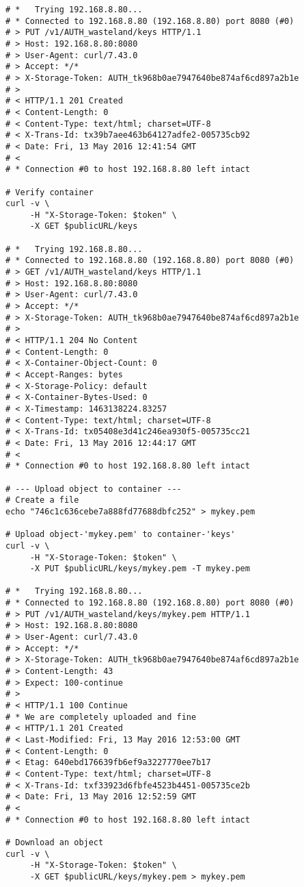 \documentclass{article}
\begin{document}
\begin{itemize}
\begin{verbatim}
# *   Trying 192.168.8.80...
# * Connected to 192.168.8.80 (192.168.8.80) port 8080 (#0)
# > PUT /v1/AUTH_wasteland/keys HTTP/1.1
# > Host: 192.168.8.80:8080
# > User-Agent: curl/7.43.0
# > Accept: */*
# > X-Storage-Token: AUTH_tk968b0ae7947640be874af6cd897a2b1e
# >
# < HTTP/1.1 201 Created
# < Content-Length: 0
# < Content-Type: text/html; charset=UTF-8
# < X-Trans-Id: tx39b7aee463b64127adfe2-005735cb92
# < Date: Fri, 13 May 2016 12:41:54 GMT
# <
# * Connection #0 to host 192.168.8.80 left intact

# Verify container
curl -v \
     -H "X-Storage-Token: $token" \
     -X GET $publicURL/keys

# *   Trying 192.168.8.80...
# * Connected to 192.168.8.80 (192.168.8.80) port 8080 (#0)
# > GET /v1/AUTH_wasteland/keys HTTP/1.1
# > Host: 192.168.8.80:8080
# > User-Agent: curl/7.43.0
# > Accept: */*
# > X-Storage-Token: AUTH_tk968b0ae7947640be874af6cd897a2b1e
# >
# < HTTP/1.1 204 No Content
# < Content-Length: 0
# < X-Container-Object-Count: 0
# < Accept-Ranges: bytes
# < X-Storage-Policy: default
# < X-Container-Bytes-Used: 0
# < X-Timestamp: 1463138224.83257
# < Content-Type: text/html; charset=UTF-8
# < X-Trans-Id: tx05408e3d41c246ea930f5-005735cc21
# < Date: Fri, 13 May 2016 12:44:17 GMT
# <
# * Connection #0 to host 192.168.8.80 left intact

# --- Upload object to container ---
# Create a file
echo "746c1c636cebe7a888fd77688dbfc252" > mykey.pem

# Upload object-'mykey.pem' to container-'keys'
curl -v \
     -H "X-Storage-Token: $token" \
     -X PUT $publicURL/keys/mykey.pem -T mykey.pem

# *   Trying 192.168.8.80...
# * Connected to 192.168.8.80 (192.168.8.80) port 8080 (#0)
# > PUT /v1/AUTH_wasteland/keys/mykey.pem HTTP/1.1
# > Host: 192.168.8.80:8080
# > User-Agent: curl/7.43.0
# > Accept: */*
# > X-Storage-Token: AUTH_tk968b0ae7947640be874af6cd897a2b1e
# > Content-Length: 43
# > Expect: 100-continue
# >
# < HTTP/1.1 100 Continue
# * We are completely uploaded and fine
# < HTTP/1.1 201 Created
# < Last-Modified: Fri, 13 May 2016 12:53:00 GMT
# < Content-Length: 0
# < Etag: 640ebd176639fb6ef9a3227770ee7b17
# < Content-Type: text/html; charset=UTF-8
# < X-Trans-Id: txf33923d6fbfe4523b4451-005735ce2b
# < Date: Fri, 13 May 2016 12:52:59 GMT
# <
# * Connection #0 to host 192.168.8.80 left intact

# Download an object
curl -v \
     -H "X-Storage-Token: $token" \
     -X GET $publicURL/keys/mykey.pem > mykey.pem


\end{verbatim}
\end{itemize}
\end{document}
